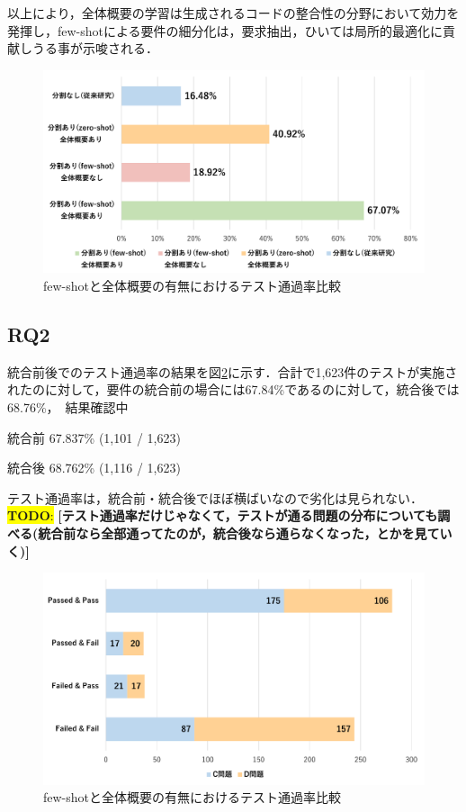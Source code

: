 \documentclass[submit,techrep,noauthor]{ipsj}
\newcommand{\todo}[1]{\colorbox{yellow}{{\bf TODO}:}{\color{red} {\textbf{[#1]}}}}
\begin{document}
以上により，全体概要の学習は生成されるコードの整合性の分野において効力を発揮し，few-shotによる要件の細分化は，要求抽出，ひいては局所的最適化に貢献しうる事が示唆される．


\begin{figure}[t]
    \centering
    \includegraphics[width=1.0\linewidth]{./Toyoshima_fig/SIGSE_fig1.pdf}
    \caption{few-shotと全体概要の有無におけるテスト通過率比較\protect\footnotemark}
    \label{ses2025}
\end{figure}

\subsection{RQ2}
統合前後でのテスト通過率の結果を図\ref{rq2_1}に示す．合計で1,623件のテストが実施されたのに対して，要件の統合前の場合には67.84\%であるのに対して，統合後では68.76\%，　結果確認中

統合前
67.837\% (1,101 / 1,623)

統合後
68.762\% (1,116 / 1,623)

テスト通過率は，統合前・統合後でほぼ横ばいなので劣化は見られない．
\todo{テスト通過率だけじゃなくて，テストが通る問題の分布についても調べる(統合前なら全部通ってたのが，統合後なら通らなくなった，とかを見ていく)}

\begin{figure}[t]
    \centering
    \includegraphics[width=1.0\linewidth]{./Toyoshima_fig/SIGSE_PF.pdf}
    \caption{few-shotと全体概要の有無におけるテスト通過率比較\protect\footnotemark}
    \label{rq2_1}
\end{figure}
\end{document}
